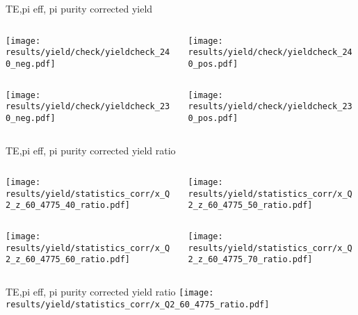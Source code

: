 \begin{frame}{TE,pi eff, pi purity corrected yield}
\begin{columns}
\begin{column}[T]{0.5\textwidth}
\texttt{[image: results/yield/check/yieldcheck\_240\_neg.pdf]}
\end{column}
\begin{column}[T]{0.5\textwidth}
\texttt{[image: results/yield/check/yieldcheck\_240\_pos.pdf]}
\end{column}
\end{columns}
\begin{columns}
\begin{column}[T]{0.5\textwidth}
\texttt{[image: results/yield/check/yieldcheck\_230\_neg.pdf]}
\end{column}
\begin{column}[T]{0.5\textwidth}
\texttt{[image: results/yield/check/yieldcheck\_230\_pos.pdf]}
\end{column}
\end{columns}
\end{frame}
\begin{frame}{TE,pi eff, pi purity corrected yield ratio}
\begin{columns}
\begin{column}[T]{0.5\textwidth}
\texttt{[image: results/yield/statistics\_corr/x\_Q2\_z\_60\_4775\_40\_ratio.pdf]}
\end{column}
\begin{column}[T]{0.5\textwidth}
\texttt{[image: results/yield/statistics\_corr/x\_Q2\_z\_60\_4775\_50\_ratio.pdf]}
\end{column}
\end{columns}
\begin{columns}
\begin{column}[T]{0.5\textwidth}
\texttt{[image: results/yield/statistics\_corr/x\_Q2\_z\_60\_4775\_60\_ratio.pdf]}
\end{column}
\begin{column}[T]{0.5\textwidth}
\texttt{[image: results/yield/statistics\_corr/x\_Q2\_z\_60\_4775\_70\_ratio.pdf]}
\end{column}
\end{columns}
\end{frame}
\begin{frame}{TE,pi eff, pi purity corrected yield ratio}
\texttt{[image: results/yield/statistics\_corr/x\_Q2\_60\_4775\_ratio.pdf]}
\end{frame}
